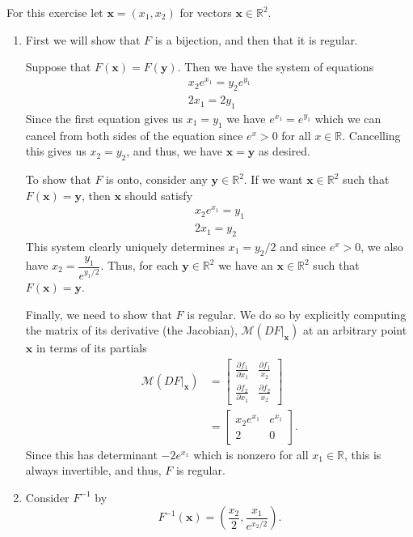 \documentclass[12 pt, letterpaper]{hmcpset}
\begin{document}
\begin{solution}
	For this exercise let $\mathbf{x} = (x_1, x_2)$ for vectors $\mathbf{x} \in \mathbb{R}^2$.	
	\begin{enumerate}
		\item	
			First we will show that $F$ is a bijection, and then that it is regular. 

			Suppose that $F(\mathbf{x}) = F(\mathbf{y})$. Then we have the system of equations
			\[
				\begin{gathered}
					x_2 e^{x_1} = y_2 e^{y_1} \\
					2 x_1 = 2 y_1
				\end{gathered}
			\]
			Since the first equation gives us $x_1 = y_1$ we have $e^{x_1} = e^{y_1}$ which we can cancel from both sides of the equation since $e^x > 0$ for all $x \in \mathbb{R}$. Cancelling this gives us $x_2 = y_2$, and thus, we have $\mathbf{x} = \mathbf{y}$ as desired. 

			To show that $F$ is onto, consider any $\mathbf{y} \in \mathbb{R}^2$. If we want $\mathbf{x} \in \mathbb{R}^2$ such that $F(\mathbf{x}) = \mathbf{y}$, then $\mathbf{x}$ should satisfy
			\[
				\begin{gathered}
					x_2 e^{x_1} = y_1 \\
					2 x_1 = y_2
				\end{gathered}
			\]
			This system clearly uniquely determines $x_1 = y_2/2$ and since $e^x > 0$, we also have $x_2 = \dfrac{y_1}{e^{y_1/2}}$. Thus, for each $\mathbf{y} \in \mathbb{R}^2$ we have an $\mathbf{x} \in \mathbb{R}^2$ such that $F(\mathbf{x}) = \mathbf{y}$. 

			Finally, we need to show that $F$ is regular. We do so by explicitly computing the matrix of its derivative (the Jacobian), $\mathcal{M} (DF \Big |_{\mathbf{x}})$ at an arbitrary point $\mathbf{x}$ in terms of its partials
			\[
				\begin{split}
					\mathcal{M} (DF \Big |_{\mathbf{x}}) & = \begin{bmatrix}
						\frac{\partial f_1}{\partial x_1} & \frac{\partial f_1}{x_2} \\
						\frac{\partial f_2}{\partial x_1} & \frac{\partial f_2}{x_2}
					\end{bmatrix} \\
									    & = \begin{bmatrix}
						x_2 e^{x_1} & e^{x_1} \\
						2 & 0
					\end{bmatrix}.
				\end{split}
			\]
			Since this has determinant $-2e^{x_1}$ which is nonzero for all $x_1 \in \mathbb{R}$, this is always invertible, and thus, $F$ is regular.
		\item 
			Consider $F^{-1}$ by
			\[
				F^{-1}(\mathbf{x}) = \left ( \frac{x_2}{2}, \frac{x_1}{e^{x_2/2}} \right ).
			\] 


\end{enumerate}
\end{solution}
\end{document}

